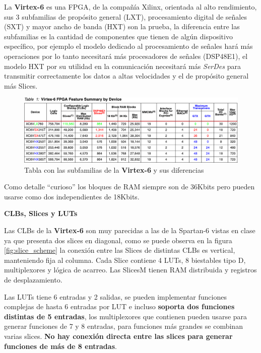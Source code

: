 \documentclass[11pt,a4paper]{article}
\begin{document}

La \textbf{Virtex-6} es una FPGA, de la compañía Xilinx, orientada al alto rendimiento, sus 3 subfamilias de propósito general (LXT), procesamiento digital de señales (SXT) y mayor ancho de banda (HXT) son la prueba, la diferencia entre las subfamilias es la cantidad de componentes que tienen de algún dispositivo específico, por ejemplo el modelo dedicado al procesamiento de señales hará más operaciones por lo tanto necesitará más procesadores de señales (DSP48E1), el modelo HXT por su utilidad en la comunicación necesitará más \textit{SerDes} para transmitir correctamente los datos a altas velocidades y el de propósito general más Slices.

\begin{figure}[h]
    \centering
    \includegraphics[scale=0.75]{images/Virtex-6 FPGA feature summary.pdf}
    \caption{Tabla con las subfamilias de la \textbf{Virtex-6} y sus diferencias}
\end{figure}

Como detalle ``curioso'' los bloques de RAM siempre son de 36Kbits pero pueden usarse como dos independientes de 18Kbits.

{\Large \textbf{CLBs, Slices y LUTs}}

Las CLBs de la \textbf{Virtex-6} son muy parecidas a las de la Spartan-6 vistas en clase ya que presenta dos slices en diagonal, como se puede observa en la figura \ref{fig:slice_scheme} la conexión entre las Slices de distintas CLBs es vertical, manteniendo fija al columna. Cada Slice contiene 4 LUTs, 8 biestables tipo D, multiplexores y lógica de acarreo. Las SlicesM tienen RAM distribuida y registros de desplazamiento.\par
\begin{figure} 
    \centering
\end{figure}\par
 Las LUTs tiene 6 entradas y 2 salidas, se pueden implementar funciones complejas de hasta 6 entradas por LUT e incluso \textbf{soporta dos funciones distintas de 5 entradas}, los multiplexores que contienen pueden usarse para generar funciones de 7 y 8 entradas, para funciones más grandes se combinan varias slices. \textbf{No hay conexión directa entre las slices para generar funciones de más de 8 entradas}.
\end{document}
